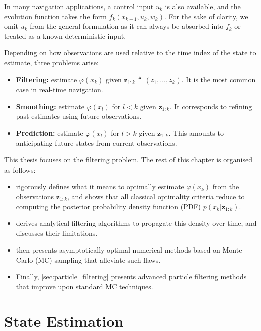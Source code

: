\begin{remark}
	In many navigation applications, a control input $u_k$ is also available, and the evolution function takes the form $f_k(x_{k-1}, u_k, w_k)$. For the sake of clarity, we omit $u_k$ from the general formulation as it can always be absorbed into $f_k$ or treated as a known deterministic input.
\end{remark}

Depending on how observations are used relative to the time index of the state to estimate, three problems arise:
\begin{itemize}
	\item \textbf{Filtering:} estimate $\varphi(x_k)$ given $\mathbf{z}_{1:k}\triangleq(z_1,\dots,z_k)$. It is the most common case in real-time navigation.
	\item \textbf{Smoothing:} estimate $\varphi(x_l)$ for $l < k$ given $\mathbf{z}_{1:k}$. It corresponds to refining past estimates using future observations.
	\item \textbf{Prediction:} estimate $\varphi(x_l)$ for $l > k$ given $\mathbf{z}_{1:k}$. This amounts to anticipating future states from current observations.
\end{itemize}

This thesis focuses on the filtering problem. The rest of this chapter is organised as follows:
\begin{itemize}
	\item{} rigorously defines what it means to optimally estimate $\varphi(x_k)$ from the observations $\mathbf{z}_{1:k}$, and shows that all classical optimality criteria reduce to computing the posterior probability density function (PDF) $p(x_k|\mathbf{z}_{1:k})$.
	\item{} derives analytical filtering algorithms to propagate this density over time, and discusses their limitations.
	\item{} then presents asymptotically optimal numerical methods based on Monte Carlo (MC) sampling that alleviate such flaws.
	\item Finally, \cref{sec:particle_filtering} presents advanced particle filtering methods that improve upon standard MC techniques.
\end{itemize}

\section{State Estimation}\label{sec:state_estimation}


